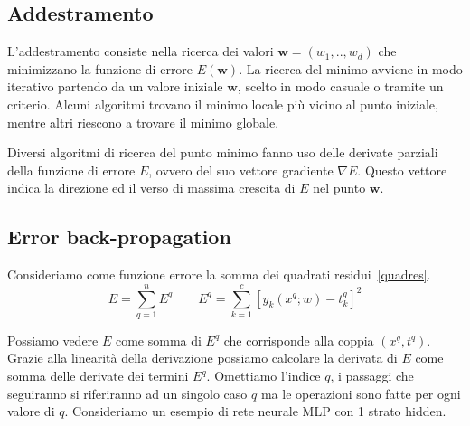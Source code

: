 \documentclass[11pt,a4paper,twoside,
openright]{book}
\begin{document}
\subsection{Addestramento}
L'addestramento consiste nella ricerca dei valori $\textbf{w}=(w_1,..,w_d)$ che minimizzano la funzione di errore $E(\textbf{w})$.
La ricerca del minimo avviene in modo iterativo partendo da un valore iniziale $\textbf{w}$, scelto in modo casuale o tramite un criterio. Alcuni algoritmi trovano il minimo locale più vicino al punto iniziale, mentre altri riescono a trovare il minimo globale.

Diversi algoritmi di ricerca del punto minimo fanno uso delle derivate parziali della funzione di errore $E$, ovvero del suo vettore gradiente $\nabla E$. Questo vettore indica la direzione ed il verso di massima crescita di $E$ nel punto $\textbf{w}$.
\subsection*{Error back-propagation~\cite{Rumelhart20081B}}
Consideriamo come funzione errore la somma dei quadrati residui~\eqref{quadres}. 
\begin{equation}
E = \sum\limits_{q=1}^n E^{q} \qquad
E^q = \sum\limits_{k=1}^c [y_k (x^q;w) - t_{k}^{q}]^2
\label{resq}
\end{equation}

Possiamo vedere $E$ come somma di $E^q$ che corrisponde alla coppia $(x^q,t^q)$. Grazie alla linearità della derivazione possiamo calcolare la derivata di $E$ come somma delle derivate dei termini $E^q$. Omettiamo l'indice $q$, i passaggi che seguiranno si riferiranno ad un singolo caso $q$ ma le operazioni sono fatte per ogni valore di $q$. Consideriamo un esempio di rete neurale MLP con 1 strato hidden.
\end{document}
